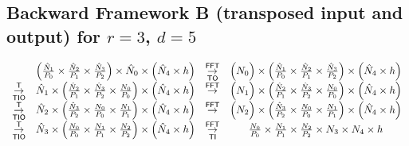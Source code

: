 \subsection{Backward Framework B (transposed input and output) for \texorpdfstring{$r=3$, $d=5$}{r=3 and d=5}}
\setlength{\arraycolsep}{2pt}
\begin{equation*}
  \begin{array}{cccc}
    & \left(\frac{\hat N_1}{P_0} \times \frac{\hat N_2}{P_1} \times \frac{\hat N_3}{P_2}\right) \times \hat N_0 \times \left(\hat N_4 \times h\right)
    & \overset{\textsf{FFT}}{\underset{\textsf{TO}}{\rightarrow}} & \Big(N_0\Big) \times \left(\frac{\hat N_1}{P_0} \times \frac{\hat N_2}{P_1} \times \frac{\hat N_3}{P_2}\right) \times \left(\hat N_4 \times h\right) \\
    \overset{\textsf{T}}{\underset{\textsf{TIO}}{\rightarrow}} & \hat N_1 \times \left(\frac{\hat N_2}{P_1} \times \frac{\hat N_3}{P_2} \times \frac{N_0}{P_0}\right) \times \left(\hat N_4 \times h\right)
    & \overset{\textsf{FFT}}{\rightarrow} & \Big(N_1\Big) \times \left(\frac{\hat N_2}{P_1} \times \frac{\hat N_3}{P_2} \times \frac{N_0}{P_0}\right) \times \left(\hat N_4 \times h\right) \\
    \overset{\textsf{T}}{\underset{\textsf{TIO}}{\rightarrow}} & \hat N_2 \times \left(\frac{\hat N_3}{P_2} \times \frac{N_0}{P_0} \times \frac{N_1}{P_1}\right) \times \left(\hat N_4 \times h\right)
    & \overset{\textsf{FFT}}{\rightarrow} & \Big(N_2\Big) \times \left(\frac{\hat N_3}{P_2} \times \frac{N_0}{P_0} \times \frac{N_1}{P_1}\right) \times \left(\hat N_4 \times h\right) \\
    \overset{\textsf{T}}{\underset{\textsf{TIO}}{\rightarrow}} & \hat N_3 \times \left(\frac{N_0}{P_0} \times \frac{N_1}{P_1}  \times \frac{N_2}{P_2}\right) \times \left(\hat N_4 \times h\right)
    & \overset{\textsf{FFT}}{\underset{\textsf{TI}}{\rightarrow}} & \frac{N_0}{P_0} \times \frac{N_1}{P_1}  \times \frac{N_2}{P_2} \times N_3 \times N_4 \times h
  \end{array}
\end{equation*}

